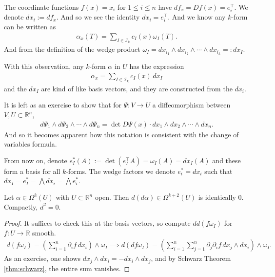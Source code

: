 \begin{remark}\label{rem:k-forms}
	The coordinate functions $f(x) = x_{i}$ for $1 \leq i \leq n$ have $df_{x} = Df(x) = e_{i}^\top$. We denote $dx_{i} := df_{x}$. And so we see the identity $dx_{i} = e_{i}^\top$. And we know any $k$-form can be written as
	\begin{align*}
		\alpha_{x} (T) = \sum_{I \in \mathcal{I}_{k}} c_{I}(x) \omega_{I}(T).
	\end{align*}
	And from the definition of the wedge product $\omega_{I} = dx_{i_{1}} \wedge dx_{i_{2}} \wedge \cdots \wedge dx_{i_{k}} =: dx_{I}$.

	With this observation, any $k$-form $\alpha $ in $U$ has the expression
	\begin{align*}
		\alpha_{x} = \sum_{I \in \mathcal{I}_{k}} c_{I}(x) \, dx_{I}
	\end{align*}
	and the $dx_{I}$ are kind of like basis vectors, and they are constructed from the $dx_{i}$.

	It is left as an exercise to show that for $\Psi: V \to U$ a diffeomorphism between $V, U \subset \mathbb{R}^{n}$,
	\begin{align*}
		d \Psi_{1} \wedge d \Psi_{2} \wedge \cdots \wedge d \Psi_{n} = \det D \Psi(x) \cdot d x_{1} \wedge dx_{2} \wedge \cdots \wedge dx_{n}.
	\end{align*}
	And so it becomes apparent how this notation is consistent with the change of variables formula.

	From now on, denote $ e^*_{I}(A)  := \det (e_{I}^\top A) = \omega_{I}(A) = dx_{I}(A)$ and these form a basis for all $k$-forms. The wedge factors we denote $e_{i}^* = dx_{i}$ such that $dx_{I} = e_{I}^* = \bigwedge dx_{i} = \bigwedge e_{i}^*$.
\end{remark}

\begin{lemma}\label{lem:double-diff}
	Let $\alpha \in \Omega^{k}(U)$ with $U \subset \mathbb{R}^{n}$ open. Then $d(d\alpha ) \in \Omega^{k+2}(U)$ is identically $0$. Compactly, $d^{2} = 0$.
\end{lemma}
\begin{proof}
	It suffices to check this at the basis vectors, so compute $d d(f \omega_{I})$ for $f: U \to \mathbb{R}$ smooth.
	\begin{align*}
		d (f \omega_{I}) = \left(\sum_{i=1}^{n} \partial_{i}f \, dx_{i}\right) \wedge \omega_{I} \implies d(df \omega_{I}) = \left(\sum_{i=1}^{n}  \sum_{j=1}^{n} \partial_{j} \partial_{i} f \, dx_{j} \wedge dx_{i}\right) \wedge \omega_{I}.
	\end{align*}
	As an exercise, one shows $dx_{j} \wedge dx_{i} = - dx_{i} \wedge dx_{j}$, and by Schwarz Theorem \ref{thm:schwarz}, the entire sum vanishes.
\end{proof}
